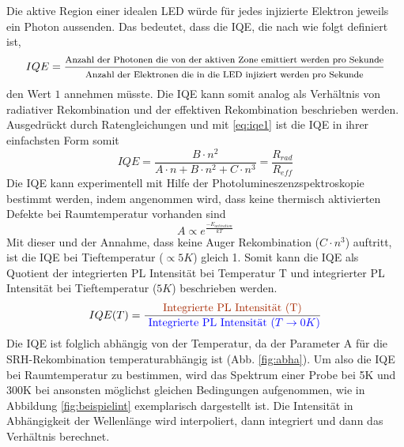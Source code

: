 \noindent
Die aktive Region einer idealen LED würde für jedes injizierte Elektron jeweils ein Photon aussenden. 
Das bedeutet, dass die IQE, die nach \cite{schub} wie folgt definiert ist,
\begin{equation}
    IQE = \frac{ \footnotesize \text{Anzahl der Photonen die von der aktiven Zone emittiert werden pro Sekunde}}{ \footnotesize \text{Anzahl der Elektronen die in die LED injiziert werden pro Sekunde}}
\end{equation}
den Wert $1$ annehmen müsste. Die IQE kann somit analog als Verhältnis von radiativer Rekombination und der effektiven Rekombination beschrieben werden. Ausgedrückt durch Ratengleichungen und mit \ref{eq:iqe1} ist die IQE in ihrer einfachsten Form somit
\begin{equation}
    IQE = \frac{B \cdot n^2}{A \cdot n + B \cdot n^2 + C \cdot n^3} = \frac{R_{rad}}{R_{eff}}
\end{equation}
Die IQE kann experimentell mit Hilfe der Photolumineszenzspektroskopie bestimmt werden, indem angenommen wird, dass keine thermisch aktivierten Defekte bei Raumtemperatur vorhanden sind
\begin{equation}
    A \propto e^{\frac{-E_{activation}}{kT}}
\end{equation}
Mit dieser und der Annahme, dass keine Auger Rekombination ($ C \cdot n^3 $) auftritt, ist die IQE bei Tieftemperatur ($ \propto 5K$) gleich 1. Somit kann die IQE als Quotient der integrierten PL Intensität bei Temperatur T und integrierter PL Intensität bei Tieftemperatur ($5K$) beschrieben werden.
\begin{equation}
    IQE(T) = \frac{\text{\textcolor[rgb]{0.65,0.16,0}{Integrierte PL Intensität (T)}}}{ \textcolor[rgb]{0,0,1}{\text{ Integrierte PL Intensität } (T \rightarrow 0 K)} }
    \label{eq:standardiqe}
\end{equation}
Die IQE ist folglich abhängig von der Temperatur, da der Parameter A für die SRH-Rekombination temperaturabhängig ist (Abb. \ref{fig:abha}). 
Um also die IQE bei Raumtemperatur zu bestimmen, wird das Spektrum einer Probe bei 5K und 300K bei ansonsten möglichst gleichen Bedingungen aufgenommen, wie in Abbildung \ref{fig:beispielint} exemplarisch dargestellt ist. Die Intensität in Abhängigkeit der Wellenlänge wird interpoliert, dann integriert und dann das Verhältnis berechnet. 
%